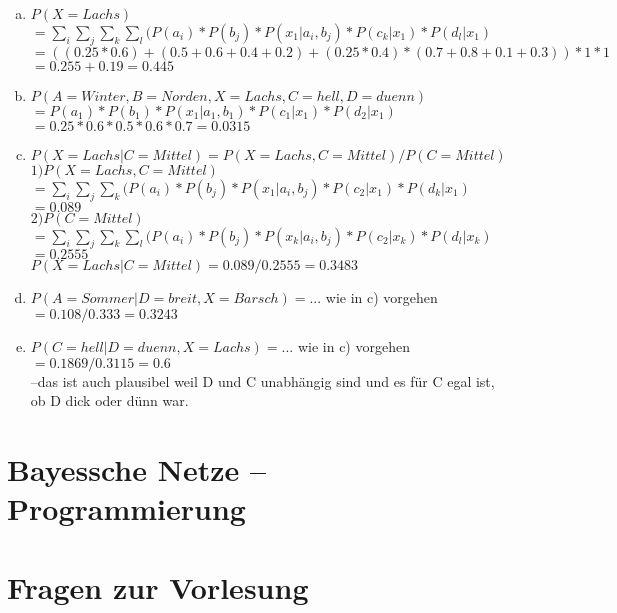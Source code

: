 \documentclass[a4paper]{scrartcl}
\begin{document}
\begin{enumerate}[(a)]
	\item 
$P(X=Lachs)$\\
$=\sum_i\sum_j\sum_k\sum_l(P(a_i)*P(b_j)*P(x_1|a_i,b_j)*P(c_k|x_1)*P(d_l|x_1)$\\
$=( (0.25*0.6)+(0.5+0.6+0.4+0.2) + (0.25*0.4)*(0.7+0.8+0.1+0.3) )*1 * 1$\\
$=0.255+0.19=0.445$	
	\item
$P(A=Winter,B=Norden,X=Lachs,C=hell,D=duenn)$\\
$=P(a_1)*P(b_1)*P(x_1|a_1,b_1)*P(c_1|x_1)*P(d_2|x_1)$\\
$= 0.25* 0.6 * 0.5 * 0.6 * 0.7 = 0.0315$
	\item 
$P(X=Lachs|C=Mittel)= P(X=Lachs,C=Mittel)/P(C=Mittel)$\\
$1)P(X=Lachs,C=Mittel)$\\
$ =\sum_i\sum_j\sum_k(P(a_i)*P(b_j)*P(x_1|a_i,b_j)*P(c_2|x_1)*P(d_k|x_1) $\\
$ = 0.089$\\
$2) P(C=Mittel)$\\
$ =\sum_i\sum_j\sum_k\sum_l(P(a_i)*P(b_j)*P(x_k|a_i,b_j)*P(c_2|x_k)*P(d_l|x_k) $\\
$ =0.2555$\\
$P(X=Lachs|C=Mittel)=0.089/0.2555 = 0.3483$
	\item 
$P(A=Sommer|D=breit,X=Barsch)=...$ wie in c) vorgehen\\
$ = 0.108/0.333 = 0.3243$
	\item 
$P(C=hell|D=duenn,X=Lachs)=...$ wie in c) vorgehen\\
$ = 0.1869 / 0.3115 = 0.6$\\ --das ist auch plausibel weil D und C unabhängig sind und es für C egal ist, ob D dick oder dünn war.
\end{enumerate}


\section{Bayessche Netze – Programmierung}



\section{Fragen zur Vorlesung}
\end{document}
